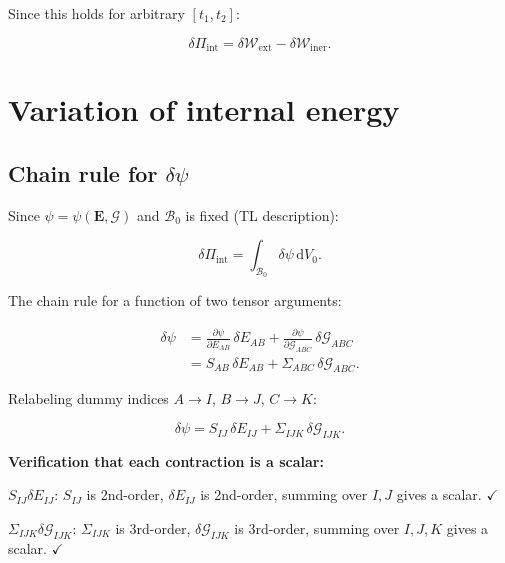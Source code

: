\documentclass[11pt]{article}
\begin{document}
Since this holds for arbitrary $[t_{1},t_{2}]$:

\begin{equation}
\boxed{
\delta\Pi_{\mathrm{int}}
= \delta\mathcal{W}_{\mathrm{ext}}
- \delta\mathcal{W}_{\mathrm{iner}}.
}
\end{equation}

\section{Variation of internal energy}

\subsection{Chain rule for $\delta\psi$}

Since $\psi=\psi(\mathbf{E},\bm{\mathcal{G}})$ and
$\mathcal{B}_{0}$ is fixed (TL description):

\begin{equation}
\delta\Pi_{\mathrm{int}}
= \int_{\mathcal{B}_{0}}\delta\psi\,\mathrm{d}V_{0}.
\end{equation}

The chain rule for a function of two tensor arguments:

\begin{align}
\delta\psi
&= \frac{\partial\psi}{\partial E_{AB}}\,\delta E_{AB}
 + \frac{\partial\psi}{\partial\mathcal{G}_{ABC}}\,\delta\mathcal{G}_{ABC}
\nonumber\\
&= S_{AB}\,\delta E_{AB}
 + \Sigma_{ABC}\,\delta\mathcal{G}_{ABC}.
\end{align}

Relabeling dummy indices $A\to I$, $B\to J$, $C\to K$:

\begin{equation}
\delta\psi = S_{IJ}\,\delta E_{IJ}
+ \Sigma_{IJK}\,\delta\mathcal{G}_{IJK}.
\end{equation}

\textbf{Verification that each contraction is a scalar:}

$S_{IJ}\delta E_{IJ}$: $S_{IJ}$ is 2nd-order, $\delta E_{IJ}$ is
2nd-order, summing over $I,J$ gives a scalar. $\checkmark$

$\Sigma_{IJK}\delta\mathcal{G}_{IJK}$: $\Sigma_{IJK}$ is 3rd-order,
$\delta\mathcal{G}_{IJK}$ is 3rd-order, summing over $I,J,K$ gives
a scalar. $\checkmark$
\end{document}
